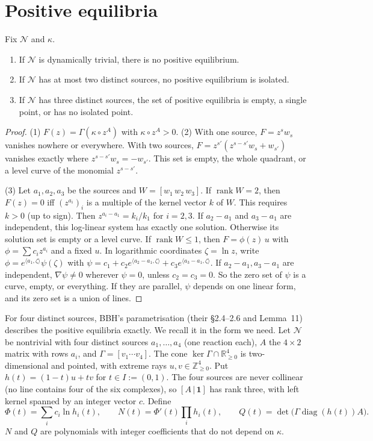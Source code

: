 \documentclass[11pt,a4paper]{report}
\providecommand{\R}{\mathbb{R}}
\newcommand{\Net}{\mathcal{N}}
\begin{document}
\section{Positive equilibria}

\begin{lemma}\label{lem:few}
Fix \(\Net\) and \(\kappa\).
\begin{enumerate}
\item If \(\Net\) is dynamically trivial, there is no positive equilibrium.
\item If \(\Net\) has at most two distinct sources, no positive equilibrium is isolated.
\item If \(\Net\) has three distinct sources, the set of positive equilibria is empty, a single point, or has no
isolated point.
\end{enumerate}
\end{lemma}

\begin{proof}
(1) \(F(z)=\Gamma(\kappa\circ z^{A})\) with \(\kappa\circ z^A>0\). (2) With one source, \(F=z^sw_s\) vanishes nowhere
or everywhere. With two sources, \(F=z^{s'}(z^{s-s'}w_s+w_{s'})\) vanishes exactly where \(z^{s-s'}w_s=-w_{s'}\).
This set is empty, the whole quadrant, or a level curve of the monomial \(z^{s-s'}\).

(3) Let \(a_1,a_2,a_3\) be the sources and \(W=[w_1\,w_2\,w_3]\). If \(\operatorname{rank}W=2\), then \(F(z)=0\) iff
\((z^{a_i})_i\) is a multiple of the kernel vector \(k\) of \(W\). This requires \(k>0\) (up to sign). Then
\(z^{a_i-a_1}=k_i/k_1\) for \(i=2,3\). If \(a_2-a_1\) and \(a_3-a_1\) are independent, this log-linear system has
exactly one solution. Otherwise its solution set is empty or a level curve. If \(\operatorname{rank}W\le1\), then
\(F=\phi(z)\,u\) with \(\phi=\sum c_iz^{a_i}\) and a fixed \(u\). In logarithmic coordinates \(\zeta=\ln z\), write
\(\phi=e^{\langle a_1,\zeta\rangle}\psi(\zeta)\) with \(\psi=c_1+c_2e^{\langle a_2-a_1,\zeta\rangle}+c_3e^{\langle
a_3-a_1,\zeta\rangle}\). If \(a_2-a_1,a_3-a_1\) are independent, \(\nabla\psi\neq0\) wherever \(\psi=0\), unless
\(c_2=c_3=0\). So the zero set of \(\psi\) is a curve, empty, or everything. If they are parallel, \(\psi\) depends on
one linear form, and its zero set is a union of lines.
\end{proof}

For four distinct sources, BBH's parametrisation (their §2.4--2.6 and Lemma~11) describes the positive
equilibria exactly. We recall it in the form we need. Let \(\Net\) be nontrivial with four distinct sources
\(a_1,\dots,a_4\) (one reaction each), \(A\) the \(4\times2\) matrix with rows \(a_i\), and \(\Gamma=[v_1\cdots
v_4]\). The cone \(\ker\Gamma\cap\R^4_{\ge0}\) is two-dimensional and pointed, with extreme rays
\(u,v\in\mathbb Z^4_{\ge0}\). Put \(h(t)=(1-t)u+tv\) for \(t\in I:=(0,1)\). The four sources are never collinear (no
line contains four of the six complexes), so \([A\,|\,\mathbf 1]\) has rank three, with left kernel spanned by an
integer vector \(c\). Define
\[
\Phi(t)=\sum_ic_i\ln h_i(t),\qquad N(t)=\Phi'(t)\prod_ih_i(t),\qquad Q(t)=\det\bigl(\Gamma\operatorname{diag}(h(t))A\bigr).
\]
\(N\) and \(Q\) are polynomials with integer coefficients that do not depend on \(\kappa\).
\end{document}
